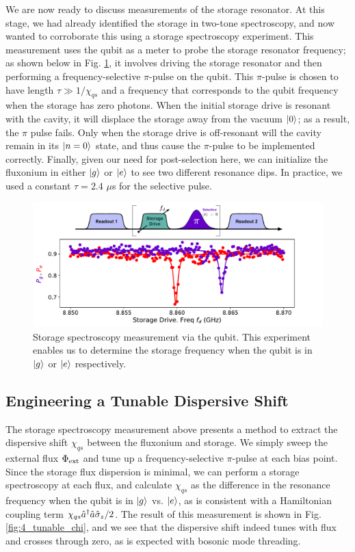 We are now ready to discuss measurements of the storage resonator. At this stage, we had already identified the storage in two-tone spectroscopy, and now wanted to corroborate this using a storage spectroscopy experiment. This measurement uses the qubit as a meter to probe the storage resonator frequency; as shown below in Fig. \ref{fig:4_storage_spectroscopy}, it involves driving the storage resonator and then performing a frequency-selective $\pi$-pulse on the qubit. This $\pi$-pulse is chosen to have length $\tau \gg 1/\chi_{qs}$ and a frequency that corresponds to the qubit frequency when the storage has zero photons. When the initial storage drive is resonant with the cavity, it will displace the storage away from the vacuum $\lvert0\rangle$; as a result, the $\pi$ pulse fails. Only when the storage drive is off-resonant will the cavity remain in its $\lvert n=0\rangle$ state, and thus cause the $\pi$-pulse to be implemented correctly. Finally, given our need for post-selection here, we can initialize the fluxonium in either $\lvert g\rangle$ or $\lvert e\rangle$ to see two different resonance dips. In practice, we used a constant $\tau = 2.4$ $\mu$s for the selective pulse.
\begin{figure}[h]
    \centering
    \includegraphics[width=0.85\linewidth]{Figures/4/storage_spectroscopy.pdf}
    \caption{Storage spectroscopy measurement via the qubit. This experiment enables us to determine the storage frequency when the qubit is in $\lvert g\rangle$ or $\lvert e\rangle$ respectively.}
    \label{fig:4_storage_spectroscopy}
\end{figure}

\subsection{Engineering a Tunable Dispersive Shift}

The storage spectroscopy measurement above presents a method to extract the dispersive shift $\chi_{qs}$ between the fluxonium and storage. We simply sweep the external flux $\Phi_{\rm ext}$ and tune up a frequency-selective $\pi$-pulse at each bias point. Since the storage flux dispersion is minimal, we can perform a storage spectroscopy at each flux, and calculate $\chi_{qs}$ as the difference in the resonance frequency when the qubit is in $\lvert g\rangle$ vs. $\lvert e\rangle$, as is consistent with a Hamiltonian coupling term $\chi_{qs} \hat{a}^\dagger\hat{a}\hat{\sigma}_z/2$. The result of this measurement is shown in Fig. \ref{fig:4_tunable_chi}, and we see that the dispersive shift indeed tunes with flux and crosses through zero, as is expected with bosonic mode threading. 

